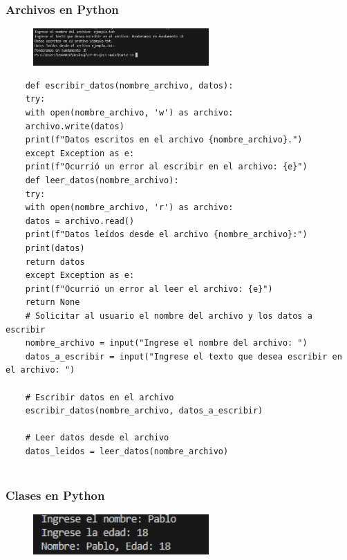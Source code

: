 \documentclass[12pt, a4paper]{article}
\begin{document}
\subsubsection*{Archivos en Python}

\begin{figure}[ht]
	\centering
	\includegraphics[width=0.6\textwidth]{images/archivos_python.png}
	\label{fig:archivos_python}
\end{figure}

\begin{verbatim}
	def escribir_datos(nombre_archivo, datos):
	try:
	with open(nombre_archivo, 'w') as archivo:
	archivo.write(datos)
	print(f"Datos escritos en el archivo {nombre_archivo}.")
	except Exception as e:
	print(f"Ocurrió un error al escribir en el archivo: {e}")
	def leer_datos(nombre_archivo):
	try:
	with open(nombre_archivo, 'r') as archivo:
	datos = archivo.read()
	print(f"Datos leídos desde el archivo {nombre_archivo}:")
	print(datos)
	return datos
	except Exception as e:
	print(f"Ocurrió un error al leer el archivo: {e}")
	return None	
	# Solicitar al usuario el nombre del archivo y los datos a escribir
	nombre_archivo = input("Ingrese el nombre del archivo: ")
	datos_a_escribir = input("Ingrese el texto que desea escribir en el archivo: ")
	
	# Escribir datos en el archivo
	escribir_datos(nombre_archivo, datos_a_escribir)
	
	# Leer datos desde el archivo
	datos_leidos = leer_datos(nombre_archivo)
	
\end{verbatim}

\subsubsection*{Clases en Python}

\begin{figure}[ht]
	\centering
	\includegraphics[width=0.6\textwidth]{images/clases_python.png}
	\label{fig:clases_python}
\end{figure}
\end{document}
